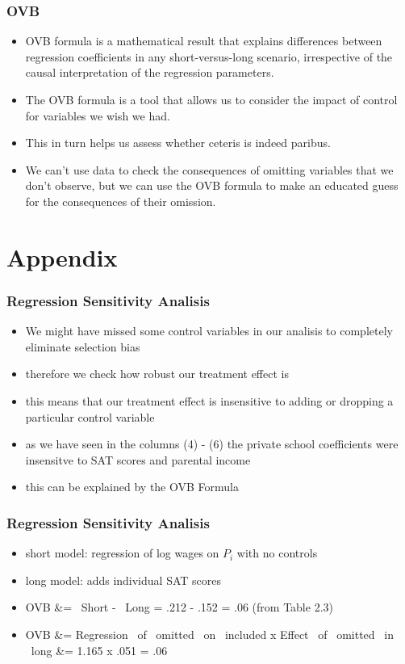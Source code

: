 \documentclass{beamer}
\begin{document}

\begin{frame}
\frametitle{OVB}
\begin{itemize}
	\item OVB formula is a mathematical result that explains differences between regression coefficients in any short-versus-long scenario, irrespective of the causal interpretation of the regression parameters.
	\item The OVB formula is a tool that allows us to consider the impact of control for variables we wish we had. 
	\item This in turn helps us assess whether ceteris is indeed paribus.
	\item We can’t use data to check the consequences of omitting variables that we don’t observe, but we can use the OVB formula to make an educated guess for the consequences of their omission.
\end{itemize}


\end{frame}


\section{Appendix}
\begin{frame}
\frametitle{Regression Sensitivity Analisis}
\begin{itemize}
	\item We might have missed some control variables in our analisis to completely eliminate selection bias
	\item therefore we check how robust our treatment effect is
	\item this means that our treatment effect is insensitive to adding or dropping a particular control variable
	\item as we have seen in the columns (4) - (6) the private school coefficients were insensitve to SAT scores and parental income
	\item this can be explained by the OVB Formula
\end{itemize}

\end{frame}

\begin{frame}
\frametitle{Regression Sensitivity Analisis}
\begin{itemize}
	\item short model: regression of log wages on $P_i$ with no controls
	\item long model: adds individual SAT scores
	\item OVB &= ~Short - ~Long = .212 - .152 = .06 (from Table 2.3)
	\item OVB &= Regression ~of ~omitted ~on ~included x Effect~ of ~omitted~ in ~long &= 1.165 x .051 = .06 
\end{itemize}
\end{frame}
\end{document}
